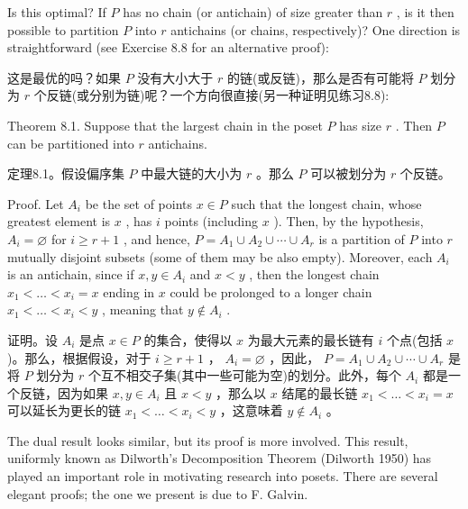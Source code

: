 \documentclass[10pt]{article}
\begin{document}
Is this optimal? If \(P\) has no chain (or antichain) of size greater than \(r\) , is it then possible to partition \(P\) into \(r\) antichains (or chains, respectively)? One direction is straightforward (see Exercise 8.8 for an alternative proof):

\begin{tcolorbox}\relax
这是最优的吗？如果 \(P\) 没有大小大于 \(r\) 的链(或反链)，那么是否有可能将 \(P\) 划分为 \(r\) 个反链(或分别为链)呢？一个方向很直接(另一种证明见练习8.8):
\end{tcolorbox}

Theorem 8.1. Suppose that the largest chain in the poset \(P\) has size \(r\) . Then \(P\) can be partitioned into \(r\) antichains.

\begin{tcolorbox}\relax
定理8.1。假设偏序集 \(P\) 中最大链的大小为 \(r\) 。那么 \(P\) 可以被划分为 \(r\) 个反链。
\end{tcolorbox}

Proof. Let \({A}_{i}\) be the set of points \(x \in  P\) such that the longest chain, whose greatest element is \(x\) , has \(i\) points (including \(x\) ). Then, by the hypothesis, \({A}_{i} = \varnothing\) for \(i \geq  r + 1\) , and hence, \(P = {A}_{1} \cup  {A}_{2} \cup  \cdots  \cup  {A}_{r}\) is a partition of \(P\) into \(r\) mutually disjoint subsets (some of them may be also empty). Moreover, each \({A}_{i}\) is an antichain, since if \(x,y \in  {A}_{i}\) and \(x < y\) , then the longest chain \({x}_{1} < \ldots  < {x}_{i} = x\) ending in \(x\) could be prolonged to a longer chain \({x}_{1} < \ldots  < {x}_{i} < y\) , meaning that \(y \notin  {A}_{i}\) .

\begin{tcolorbox}\relax
证明。设 \({A}_{i}\) 是点 \(x \in  P\) 的集合，使得以 \(x\) 为最大元素的最长链有 \(i\) 个点(包括 \(x\) )。那么，根据假设，对于 \(i \geq  r + 1\) ， \({A}_{i} = \varnothing\) ，因此， \(P = {A}_{1} \cup  {A}_{2} \cup  \cdots  \cup  {A}_{r}\) 是将 \(P\) 划分为 \(r\) 个互不相交子集(其中一些可能为空)的划分。此外，每个 \({A}_{i}\) 都是一个反链，因为如果 \(x,y \in  {A}_{i}\) 且 \(x < y\) ，那么以 \(x\) 结尾的最长链 \({x}_{1} < \ldots  < {x}_{i} = x\) 可以延长为更长的链 \({x}_{1} < \ldots  < {x}_{i} < y\) ，这意味着 \(y \notin  {A}_{i}\) 。
\end{tcolorbox}

The dual result looks similar, but its proof is more involved. This result, uniformly known as Dilworth's Decomposition Theorem (Dilworth 1950) has played an important role in motivating research into posets. There are several elegant proofs; the one we present is due to F. Galvin.
\end{document}
